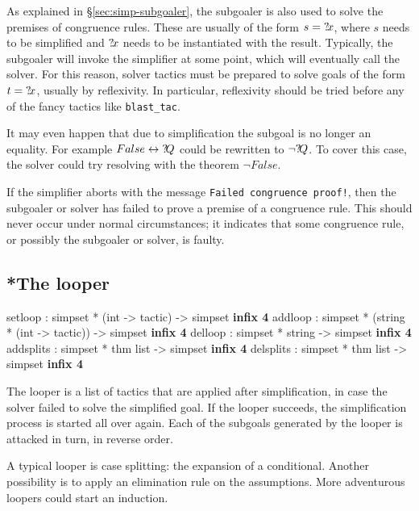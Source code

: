 \medskip

As explained in \S\ref{sec:simp-subgoaler}, the subgoaler is also used
to solve the premises of congruence rules.  These are usually of the
form $s = {?\!x}$, where $s$ needs to be simplified and ${?\!x}$
needs to be instantiated with the result.  Typically, the subgoaler
will invoke the simplifier at some point, which will eventually call
the solver.  For this reason, solver tactics must be prepared to solve
goals of the form $t = {?\!x}$, usually by reflexivity.  In
particular, reflexivity should be tried before any of the fancy
tactics like \texttt{blast_tac}.

It may even happen that due to simplification the subgoal is no longer
an equality.  For example $False \leftrightarrow {?\!Q}$ could be rewritten to
$\neg{?\!Q}$.  To cover this case, the solver could try resolving
with the theorem $\neg False$.

\medskip

\begin{warn}
  If the simplifier aborts with the message \texttt{Failed congruence
    proof!}, then the subgoaler or solver has failed to prove a
  premise of a congruence rule.  This should never occur under normal
  circumstances; it indicates that some congruence rule, or possibly
  the subgoaler or solver, is faulty.
\end{warn}


\subsection{*The looper}\label{sec:simp-looper}
\begin{ttbox}
setloop   : simpset *           (int -> tactic)  -> simpset \hfill{\bf infix 4}
addloop   : simpset * (string * (int -> tactic)) -> simpset \hfill{\bf infix 4}
delloop   : simpset *  string                    -> simpset \hfill{\bf infix 4}
addsplits : simpset * thm list -> simpset \hfill{\bf infix 4}
delsplits : simpset * thm list -> simpset \hfill{\bf infix 4}
\end{ttbox}

The looper is a list of tactics that are applied after simplification, in case
the solver failed to solve the simplified goal.  If the looper
succeeds, the simplification process is started all over again.  Each
of the subgoals generated by the looper is attacked in turn, in
reverse order.

A typical looper is case splitting: the expansion of a conditional.
Another possibility is to apply an elimination rule on the
assumptions.  More adventurous loopers could start an induction.

